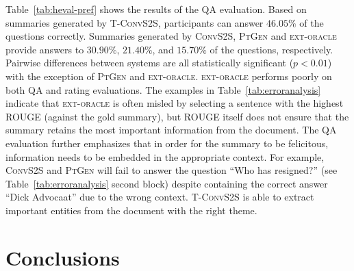 \documentclass[11pt,a4paper]{article}
\begin{document}
 


Table~\ref{tab:heval-pref} shows the results of the QA
evaluation. Based on summaries generated by \mbox{\textsc{T-ConvS2S}},
participants can answer $46.05\%$ of the questions
correctly. Summaries generated by \textsc{ConvS2S}, \textsc{PtGen} and
\textsc{ext-oracle} provide answers to $30.90\%$, $21.40\%$, and
$15.70\%$ of the questions, respectively. Pairwise differences between
systems are all statistically significant ($p < 0.01$) with the
exception of \textsc{PtGen} and \textsc{ext-oracle}.
\textsc{ext-oracle} performs poorly on both QA and rating
evaluations. The examples in Table~\ref{tab:erroranalysis} indicate
that \textsc{ext-oracle} is often misled by selecting a sentence with
the highest ROUGE (against the gold summary), but ROUGE itself does
not ensure that the summary retains the most important information
from the document.  The QA evaluation further emphasizes that in order
for the summary to be felicitous, information needs to be embedded in
the appropriate context. For example, \textsc{ConvS2S} and
\textsc{PtGen} will fail to answer the question ``Who has resigned?''
(see Table~\ref{tab:erroranalysis} second block) despite containing
the correct answer ``Dick Advocaat'' due to the wrong
context. \mbox{\textsc{T-ConvS2S}} is able to extract
important entities from the document with the right theme.


















































 



\section{Conclusions}
\end{document}
